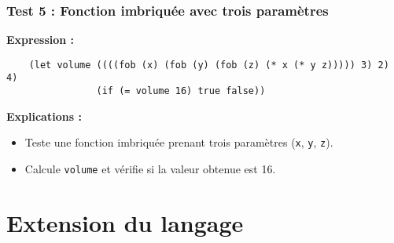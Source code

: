 \documentclass{article}
\begin{document}
\subsubsection*{Test 5 : Fonction imbriquée avec trois paramètres} 
\hspace{.5cm}\textbf{Expression :} 
\begin{verbatim} 
    (let volume ((((fob (x) (fob (y) (fob (z) (* x (* y z))))) 3) 2) 4) 
                (if (= volume 16) true false))
\end{verbatim} 
\hspace{.5cm}\textbf{Explications :} 
\begin{itemize} 
    \item Teste une fonction imbriquée prenant trois paramètres (\texttt{x}, \texttt{y}, \texttt{z}). 
    \item Calcule \texttt{volume} et vérifie si la valeur obtenue est 16. 
\end{itemize}

\newpage
\section*{Extension du langage}
\end{document}
